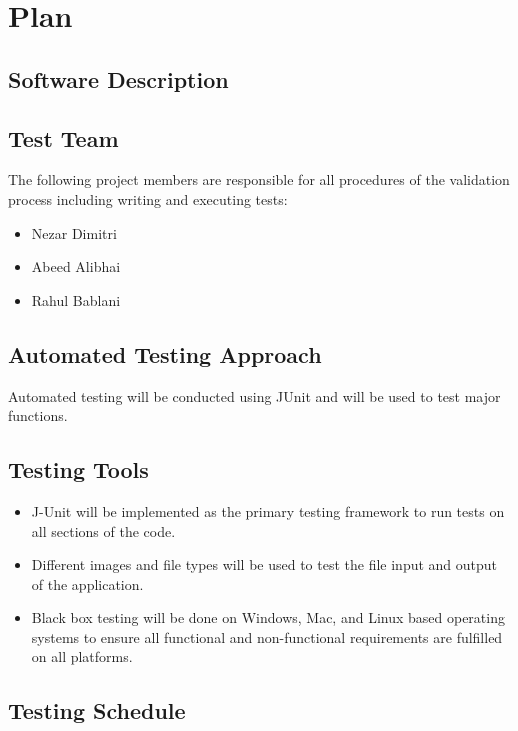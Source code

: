 \documentclass[12pt, titlepage]{article}
\begin{document}
\section{Plan}
	
\subsection{Software Description}

\subsection{Test Team}

The following project members are responsible for all procedures of the validation
process including writing and executing tests:

\begin{itemize}
\item{Nezar Dimitri}
\item{Abeed Alibhai}
\item{Rahul Bablani}
\end{itemize}

\subsection{Automated Testing Approach}

Automated testing will be conducted using JUnit and will be used to test major functions.

\subsection{Testing Tools}
\begin{itemize}
\item J-Unit will be implemented as the primary testing framework to run tests on all sections of the code.
\item Different images and file types will be used to test the file input and output of the application.
\item Black box testing will be done on Windows, Mac, and Linux based operating systems to ensure all functional and non-functional requirements are fulfilled on all platforms.
\end{itemize}

\subsection{Testing Schedule}
		
\end{document}
